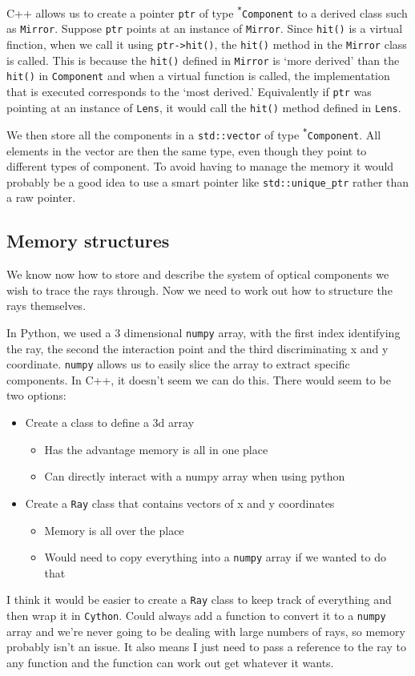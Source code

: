 \documentclass{article}
\begin{document}
C++ allows us to create a pointer \texttt{ptr} of type \texttt{\textsuperscript{*}Component} to a derived class such as \texttt{Mirror}. Suppose \texttt{ptr} points at an instance of \texttt{Mirror}. Since \texttt{hit()} is a virtual finction, when we call it using \texttt{ptr->hit()}, the \texttt{hit()} method in the \texttt{Mirror} class is called. This is because the \texttt{hit()} defined in \texttt{Mirror} is `more derived' than the \texttt{hit()} in \texttt{Component} and when a virtual function is called, the implementation that is executed corresponds to the `most derived.' Equivalently if \texttt{ptr} was pointing at an instance of \texttt{Lens}, it would call the \texttt{hit()} method defined in \texttt{Lens}.

We then store all the components in a \texttt{std::vector} of type \texttt{\textsuperscript{*}Component}. All elements in the vector are then the same type, even though they point to different types of component. To avoid having to manage the memory it would probably be a good idea to use a smart pointer like \texttt{std::unique\_ptr} rather than a raw pointer.

\subsection{Memory structures}
We know now how to store and describe the system of optical components we wish to trace the rays through. Now we need to work out how to structure the rays themselves.

In Python, we used a 3 dimensional \texttt{numpy} array, with the first index identifying the ray, the second the interaction point and the third discriminating x and y coordinate. \texttt{numpy} allows us to easily slice the array to extract specific components. In C++, it doesn't seem we can do this. There would seem to be two options:
\begin{itemize}
    \item Create a class to define a 3d array
    \begin{itemize}
        \item Has the advantage memory is all in one place
        \item Can directly interact with a numpy array when using python
    \end{itemize}
    \item Create a \texttt{Ray} class that contains vectors of x and y coordinates
    \begin{itemize}
        \item Memory is all over the place
        \item Would need to copy everything into a \texttt{numpy} array if we wanted to do that
    \end{itemize}
\end{itemize}
I think it would be easier to create a \texttt{Ray} class to keep track of everything and then wrap it in \texttt{Cython}. Could always add a function to convert it to a \texttt{numpy} array and we're never going to be dealing with large numbers of rays, so memory probably isn't an issue. It also means I just need to pass a reference to the ray to any function and the function can work out get whatever it wants.
\end{document}
